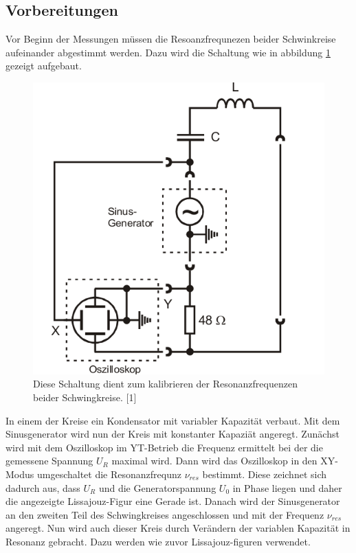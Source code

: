 \documentclass[11pt,ngerman,a4paper]{article}
\begin{document}
\subsection{Vorbereitungen}
Vor Beginn der Messungen müssen die Resoanzfrequnezen beider Schwinkreise aufeinander abgestimmt werden. Dazu wird die Schaltung wie in abbildung \ref{abb1} gezeigt aufgebaut.
\begin{figure}[htp]
\centering
\includegraphics[scale=0.5]{Abb/abb1.png}
\caption{Diese Schaltung dient zum kalibrieren der Resonanzfrequenzen beider Schwingkreise. [1]}
\label{abb1}
\end{figure}
In einem der Kreise ein Kondensator mit variabler Kapazität verbaut. Mit dem Sinusgenerator wird nun der Kreis mit konstanter Kapazi\"at angeregt. Zunächst wird mit dem Oszilloskop im YT-Betrieb die Frequenz ermittelt bei der die gemessene Spannung $U_R$ maximal wird. Dann wird das Oszilloskop in den XY-Modus umgeschaltet die Resonanzfrequnz $\nu_{res}$ bestimmt. Diese zeichnet sich dadurch aus, dass $U_R$ und die Generatorspannung $U_0$ in Phase liegen und daher die angezeigte Lissajouz-Figur eine Gerade ist. Danach wird der Sinusgenerator an den zweiten Teil des Schwingkreises angeschlossen und mit der Frequenz $\nu_{res}$ angeregt. Nun wird auch dieser Kreis durch Verändern der variablen Kapazität in Resonanz gebracht. Dazu werden wie zuvor Lissajouz-figuren verwendet. 
\end{document}

